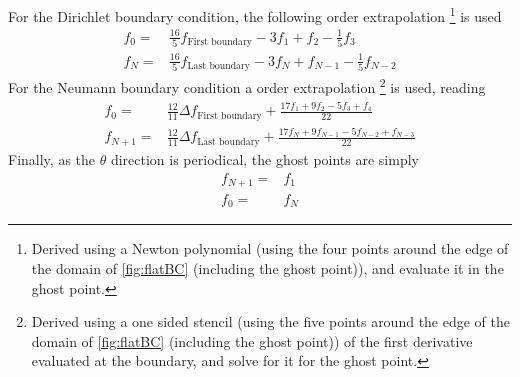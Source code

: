 For the Dirichlet boundary condition, the following  order extrapolation %
%
\footnote{
Derived using a Newton polynomial (using the four points around the edge of the domain of \cref{fig:flatBC} (including the ghost point)), and evaluate it in the ghost point.
}%
is used
%
\begin{align*}
      f_{0} =& \frac{16}{5}f_{\text{First boundary}}
              - 3          f_1
              +            f_2
              - \frac{1}{5}f_3
    \\
      f_{N} =& \frac{16}{5}f_{\text{Last boundary}}
              - 3          f_{N}
              +            f_{N-1}
              - \frac{1}{5}f_{N-2}
\end{align*}
%
For the Neumann boundary condition a  order extrapolation %
%
\footnote{
Derived using a one sided stencil (using the five points around the edge of the domain of \cref{fig:flatBC} (including the ghost point)) of the first derivative evaluated at the boundary, and solve for it for the ghost point.
}%
%
is used, reading
%
\begin{align*}
      f_0 =& \frac{12}{11}\Delta f_{\text{First boundary}}
                +
                \frac{
                  17f_1
                +  9f_2
                -  5f_3
                +   f_4
               }{22}
    \\
      f_{N+1} =& \frac{12}{11}\Delta f_{\text{Last boundary}}
                +
                \frac{
                  17f_{N}
                +  9f_{N-1}
                -  5f_{N-2}
                +   f_{N-3}
               }{22}
\end{align*}
%
Finally, as the $\theta$ direction is periodical, the ghost points are simply
%
\begin{align*}
    f_{N+1} =& f_{1}
    \\
    f_{0} =& f_{N}
\end{align*}
